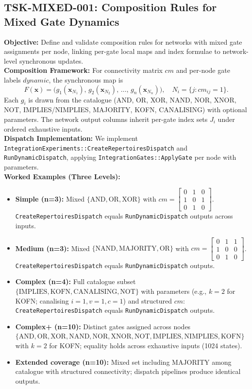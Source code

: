 \documentclass[11pt]{article}
\begin{document}
\subsection{TSK-MIXED-001: Composition Rules for Mixed Gate Dynamics}
\textbf{Objective:} Define and validate composition rules for networks with mixed gate assignments per node, linking per-gate local maps and index formulae to network-level synchronous updates.\\
\textbf{Composition Framework:} For connectivity matrix \(cm\) and per-node gate labels \(dynamic\), the synchronous map is
\[
F(\mathbf{x}) = \big(g_1(\mathbf{x}_{N_1}),\, g_2(\mathbf{x}_{N_2}),\,\dots,\, g_n(\mathbf{x}_{N_n})\big),\quad N_i=\{j: cm_{ij}=1\}.
\]
Each \(g_i\) is drawn from the catalogue (AND, OR, XOR, NAND, NOR, XNOR, NOT, IMPLIES/NIMPLIES, MAJORITY, KOFN, CANALISING) with optional parameters. The network output columns inherit per-gate index sets \(J_i\) under ordered exhaustive inputs.\\
\textbf{Dispatch Implementation:} We implement \texttt{Integration\textasciigrave Experiments::CreateRepertoiresDispatch} and \texttt{RunDynamicDispatch}, applying \texttt{Integration\textasciigrave Gates::ApplyGate} per node with parameters.\\
\textbf{Worked Examples (Three Levels):}
\begin{itemize}
\item \textbf{Simple (n=3):} Mixed \(\{\mathrm{AND}, \mathrm{OR}, \mathrm{XOR}\}\) with \(cm = \begin{bmatrix}0&1&0\\1&0&1\\0&1&0\end{bmatrix}\). \texttt{CreateRepertoiresDispatch} equals \texttt{RunDynamicDispatch} outputs across inputs.
\item \textbf{Medium (n=3):} Mixed \(\{\mathrm{NAND}, \mathrm{MAJORITY}, \mathrm{OR}\}\) with \(cm = \begin{bmatrix}0&1&1\\1&0&0\\0&1&0\end{bmatrix}\). \texttt{CreateRepertoiresDispatch} equals \texttt{RunDynamicDispatch} outputs.
\item \textbf{Complex (n=4):} Full catalogue subset \(\{\mathrm{IMPLIES}, \mathrm{KOFN}, \mathrm{CANALISING}, \mathrm{NOT}\}\) with parameters (e.g., \(k=2\) for KOFN; canalising \(i=1, v=1, c=1\)) and structured \(cm\): \texttt{CreateRepertoiresDispatch} equals \texttt{RunDynamicDispatch} outputs.
\item \textbf{Complex+ (n=10):} Distinct gates assigned across nodes \(\{\mathrm{AND}, \mathrm{OR}, \mathrm{XOR}, \mathrm{NAND}, \mathrm{NOR}, \mathrm{XNOR}, \mathrm{NOT}, \mathrm{IMPLIES}, \mathrm{NIMPLIES}, \mathrm{KOFN}\}\) with \(k=2\) for KOFN; equality holds across exhaustive inputs (1024 states).
\item \textbf{Extended coverage (n=10):} Mixed set including \(\mathrm{MAJORITY}\) among catalogue with structured connectivity; dispatch pipelines produce identical outputs.
\end{itemize}
\end{document}
